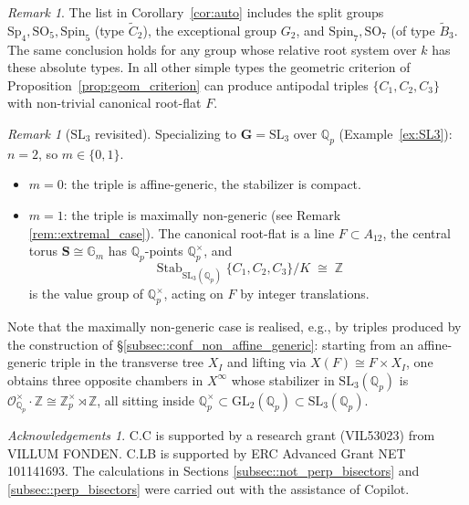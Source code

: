 \documentclass[11pt]{amsart}
\newcommand{\bbQ}{\mathbb{Q}}
\newcommand{\bbZ}{\mathbb{Z}}
\newcommand{\bbG}{\mathbb{G}}
\newcommand{\bfG}{\mathbf{G}}
\newcommand{\bfS}{\mathbf{S}}
\newcommand{\SL}{\mathrm{SL}}
\newcommand{\GL}{\mathrm{GL}}
\DeclareMathOperator{\Stab}{Stab}
\theoremstyle{plain}
\theoremstyle{definition}
\theoremstyle{remark}
\newtheorem{rem}[thm]{Remark}
\newtheorem*{ackn}{Acknowledgements}
\begin{document}
	\begin{rem}\label{rem:rank_function}
		The list in Corollary~\ref{cor:auto} includes the split groups $\mathrm{Sp}_4,\mathrm{SO}_5,\mathrm{Spin}_5$ (type $\widetilde C_2$), the exceptional group $G_2$, and $\mathrm{Spin}_7,\mathrm{SO}_7$ (of type $\widetilde B_3$. The same conclusion holds for any group whose relative root system over $k$ has these absolute types. In all other simple types the geometric criterion of Proposition~\ref{prop:geom_criterion} can produce antipodal triples $\{C_1,C_2,C_3\}$ with non-trivial canonical root-flat $F$. 
	\end{rem}
	
	\begin{rem}[$\SL_3$ revisited]\label{rem:SL3}
		Specializing to $\bfG=\SL_3$ over $\bbQ_p$ (Example~\ref{ex:SL3}): $n=2$, so $m\in\{0,1\}$.
		\begin{itemize}
			\item $m=0$: the triple is affine-generic, the stabilizer is compact.
			\item $m=1$: the triple is maximally non-generic (see Remark \ref{rem::extremal_case}). The canonical root-flat is a line $F\subset A_{12}$, the central torus $\bfS\cong\bbG_m$ has $\bbQ_p$-points $\bbQ_p^\times$, and
			\[
			\Stab_{\SL_3(\bbQ_p)}\{C_1,C_2,C_3\}/K \;\cong\; \bbZ
			\]
			is the value group of $\bbQ_p^\times$, acting on $F$ by integer translations.
		\end{itemize}
		Note that the maximally non-generic case is realised, e.g., by triples produced by the construction of \S\ref{subsec::conf_non_affine_generic}: starting from an affine-generic triple in the transverse tree $X_I$ and lifting via $X(F)\cong F\times X_I$, one obtains three opposite chambers in $X^\infty$ whose stabilizer in $\SL_3(\bbQ_p)$ is $\mathcal O_{\bbQ_p}^\times\cdot\bbZ\cong\bbZ_p^\times\rtimes\bbZ$, all sitting inside $\bbQ_p^\times\subset\GL_2(\bbQ_p)\subset\SL_3(\bbQ_p)$.
	\end{rem}
	

	
	\begin{ackn}
		C.C is supported by a research grant (VIL53023) from VILLUM FONDEN.  C.LB is supported by ERC Advanced Grant NET 101141693.  The calculations in Sections \ref{subsec::not_perp_bisectors} and \ref{subsec::perp_bisectors} were carried out with the assistance of Copilot. 
	\end{ackn}
	
	
	
		
\end{document}
